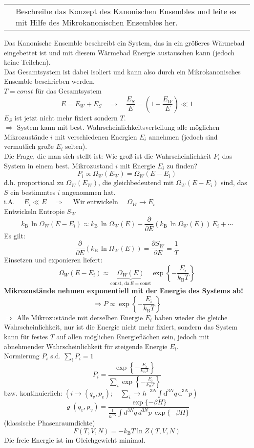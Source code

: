 \documentclass[a4paper,12pt]{scrartcl}
\makeatletter
\def\pf#1#2{\frac{\partial #1}{\partial #2}}		%
\def\ka#1{\left(#1\right)}				%
\def\const{\mathrm{const}}				%
\def\dx#1{\mathrm{d}^{#1}}				%
\def\kB{k_\mathrm{B}}					%
\newcounter{qc}\setcounter{qc}{1}
\newenvironment{fshaded}{
\def\FrameCommand{\fcolorbox{framecolor}{shadecolor}}
\MakeFramed {\FrameRestore}}
{\endMakeFramed}
\def\frage#1{
\begin{fshaded}
\noindent
\begin{tabularx}{0.99\textwidth}{@{}c!{\color{framecolor}\vline}X}
{ \bf \rm \theqc }	&	\noindent #1
\end{tabularx}
\stepcounter{qc}
\end{fshaded}
}
\makeatother
\begin{document}
\frage{Beschreibe das Konzept des Kanonischen Ensembles und leite es mit Hilfe des Mikrokanonischen Ensembles her.}
\noindent
Das Kanonische Ensemble beschreibt ein System, das in ein größeres Wärmebad eingebettet ist und mit diesem Wärmebad Energie 
austauschen kann (jedoch keine Teilchen).\\
Das Gesamtsystem ist dabei isoliert und kann also durch ein Mikrokanonisches Ensemble beschrieben werden.\\
$T=const$ für das Gesamtsystem
 \[ E=E_W+E_S \quad \Rightarrow \quad \frac{E_S}{E}=\left( 1- \frac{E_W}{E} \right) \ll 1 \]
$E_S$ ist jetzt nicht mehr fixiert sondern $T$.\\
$\Rightarrow$ System kann mit best. Wahrscheinlichkeitsverteilung alle möglichen Mikrozustände $i$ mit verschiedenen Energien 
$E_i$ annehmen (jedoch sind vermutlich große $E_i$ selten).\\
Die Frage, die man sich stellt ist: Wie groß ist die Wahrscheinlichkeit $P_i$ das System in einem best. Mikrozustand $i$ mit 
Energie $E_i$ zu finden?
 \[ P_i \propto \Omega_W(E_W)=\Omega_W(E-E_i) \]
d.h. proportional zu $\Omega_W(E_W)$, die gleichbedeutend mit $\Omega_W(E-E_i)$ sind, das $S$ ein bestimmtes $i$ angenommen 
hat.\\
i.A. $\quad E_i \ll E \quad \Rightarrow \quad$ Wir entwickeln $\quad \Omega_W \rightarrow E_i$\\
Entwickeln Entropie $S_W$
 \[ \kB \,\ln{\Omega_W(E-E_i)} \approx \kB \,\ln{\Omega_W(E)}-\frac{\partial}{\partial E}(\kB \,\ln{\Omega_W(E)})\,E_i+\cdots \]
Es gilt:
 \[ \pf{}{E}(\kB \,\ln{\Omega_W(E)})=\pf{S_W}{E}=\frac{1}{T} \] 
Einsetzen und exponieren liefert:
 \[ \Omega_W(E-E_i) \approx \underbrace{\Omega_W(E)}_{\const\text{, da}\,E=\const} \exp{} \left\{ -\frac{E_i}{\kB  T} \right\}  \] 
{\bf Mikrozustände nehmen exponentiell mit der Energie des Systems ab!}
 \[ \Rightarrow P \propto \exp{} \left\{ -\frac{E_i}{\kB  T} \right\} \] 
$\Rightarrow$ Alle Mikrozustände mit derselben Energie $E_i$ haben wieder die gleiche Wahrscheinlichkeit, nur ist die Energie 
nicht mehr fixiert, sondern das System kann für festes $T$ auf allen möglichen Energieflächen sein, jedoch mit abnehmender 
Wahrscheinlichkeit für steigende Energie $E_i$.\\
Normierung $P_i$ s.d. $\sum_i P_i=1$
 \[ P_i=\frac{\exp{} \left\{ -\frac{E_i}{\kB  T} \right\}}{\sum_i \exp{} \left\{ -\frac{E_i}{\kB  T} \right\}} \] 
bzw. kontinuierlich: $\ka{i \rightarrow (q_v,p_v);\quad \sum_i \rightarrow {h^{-3N}}\int \dx{3N}q\,\dx{3N}p}$\\
 \[ \varrho(q_v,p_v)=\frac{\exp{\{-\beta H\}}}{\frac{1}{h^{3N}}\int d^{3N}q\,d^{3N}p\,\exp{\{-\beta H\}} } \] 
(klassische Phasenraumdichte)\\
 \[ F(T,V,N)=-\kB  T \ln{Z(T,V,N)} \] 
Die freie Energie ist im Gleichgewicht minimal.\\
\end{document}

